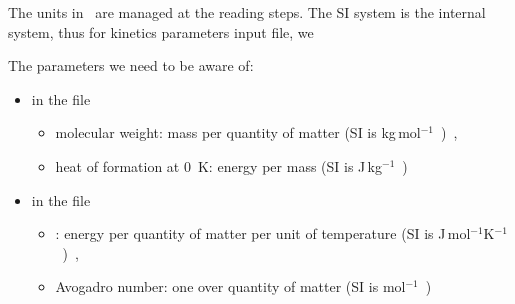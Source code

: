 The units in \antioch\ are managed at the reading
steps. The SI system is the internal system, thus
for kinetics parameters input file, we


The parameters we need to be aware of:
\begin{itemize}
\item in the file 
        \begin{itemize}
        \item molecular weight: mass per quantity of matter (SI is \unit{kg\,mol$^{-1}$}),
        \item heat of formation at 0~\unit{K}: energy per mass (SI is \unit{J\,kg$^{-1}$})
        \end{itemize}
\item in the file 
        \begin{itemize}
        \item \Rg: energy per quantity of matter per unit of temperature (SI is \unit{J\,mol$^{-1}$K$^{-1}$}),
        \item Avogadro number: one over quantity of matter (SI is \unit{mol$^{-1}$})
        \end{itemize}
\end{itemize}

